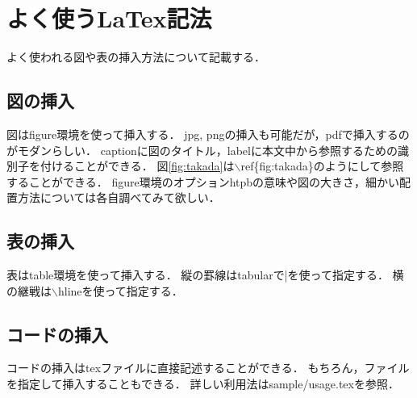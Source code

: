 \chapter{よく使うLaTex記法}
よく使われる図や表の挿入方法について記載する．

\section{図の挿入}
図はfigure環境を使って挿入する．
jpg, pngの挿入も可能だが，pdfで挿入するのがモダンらしい．
captionに図のタイトル，labelに本文中から参照するための識別子を付けることができる．
図\ref{fig:takada}は$\backslash$ref\{fig:takada\}のようにして参照することができる．
figure環境のオプションhtpbの意味や図の大きさ，細かい配置方法については各自調べてみて欲しい．

\begin{minipage}{\textwidth}
  
\end{minipage}




\section{表の挿入}
表はtable環境を使って挿入する．
縦の罫線はtabularで|を使って指定する．
横の継戦は$\backslash$hlineを使って指定する．

\begin{minipage}{\textwidth}
  
\end{minipage}




\section{コードの挿入}
コードの挿入はtexファイルに直接記述することができる．
もちろん，ファイルを指定して挿入することもできる．
詳しい利用法はsample/usage.texを参照．
